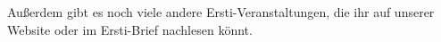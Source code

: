 \normalsize
Außerdem gibt es noch viele andere Ersti-Veranstaltungen, die ihr auf unserer Website oder im Ersti-Brief nachlesen könnt. 


\newpage
\normalsize


